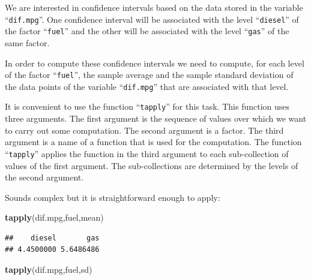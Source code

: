 \documentclass[]{krantz}
\makeatletter
\newenvironment{Shaded}{\begin{snugshade}}{\end{snugshade}}
\newcommand{\KeywordTok}[1]{\textcolor[rgb]{0.13,0.29,0.53}{\textbf{#1}}}
\newcommand{\StringTok}[1]{\textcolor[rgb]{0.31,0.60,0.02}{#1}}
\newcommand{\OperatorTok}[1]{\textcolor[rgb]{0.81,0.36,0.00}{\textbf{#1}}}
\newcommand{\NormalTok}[1]{#1}
\newenvironment{kframe}{%
\medskip{}
\setlength{\fboxsep}{.8em}
 \def\at@end@of@kframe{}%
 \ifinner\ifhmode%
  \def\at@end@of@kframe{\end{minipage}}%
  \begin{minipage}{\columnwidth}%
 \fi\fi%
 \def\FrameCommand##1{\hskip\@totalleftmargin \hskip-\fboxsep
 \colorbox{shadecolor}{##1}\hskip-\fboxsep
     \hskip-\linewidth \hskip-\@totalleftmargin \hskip\columnwidth}%
 \MakeFramed {\advance\hsize-\width
   \@totalleftmargin\z@ \linewidth\hsize
   \@setminipage}}%
 {\par\unskip\endMakeFramed%
 \at@end@of@kframe}
\renewenvironment{Shaded}{\begin{kframe}}{\end{kframe}}
\theoremstyle{definition}
\theoremstyle{definition}
\theoremstyle{definition}
\theoremstyle{remark}
\makeatother
\begin{document}
\begin{Shaded}
\end{Shaded}

We are interested in confidence intervals based on the data stored in
the variable ``\texttt{dif.mpg}''. One confidence interval will be
associated with the level ``\texttt{diesel}'' of the factor
``\texttt{fuel}'' and the other will be associated with the level
``\texttt{gas}'' of the same factor.

In order to compute these confidence intervals we need to compute, for
each level of the factor ``\texttt{fuel}'', the sample average and the
sample standard deviation of the data points of the variable
``\texttt{dif.mpg}'' that are associated with that level.

It is convenient to use the function ``\texttt{tapply}'' for this task.
This function uses three arguments. The first argument is the sequence
of values over which we want to carry out some computation. The second
argument is a factor. The third argument is a name of a function that is
used for the computation. The function ``\texttt{tapply}'' applies the
function in the third argument to each sub-collection of values of the
first argument. The sub-collections are determined by the levels of the
second argument.

Sounds complex but it is straightforward enough to apply:

\begin{Shaded}
\begin{Highlighting}[]
\KeywordTok{tapply}\NormalTok{(dif.mpg,fuel,mean)}
\end{Highlighting}
\end{Shaded}

\begin{verbatim}
##    diesel       gas 
## 4.4500000 5.6486486
\end{verbatim}

\begin{Shaded}
\begin{Highlighting}[]
\KeywordTok{tapply}\NormalTok{(dif.mpg,fuel,sd)}
\end{Highlighting}
\end{Shaded}
\end{document}

